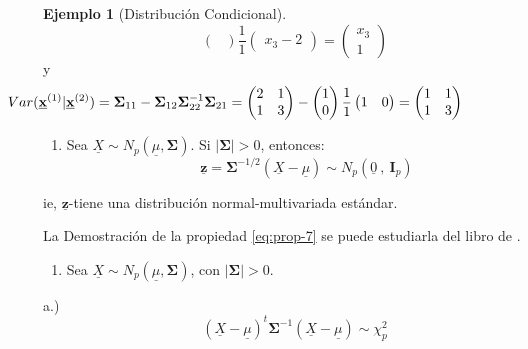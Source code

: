 \documentclass[
]{book}
\providecommand{\tightlist}{%
  \setlength{\itemsep}{0pt}\setlength{\parskip}{0pt}}
\theoremstyle{definition}
\theoremstyle{definition}
\newtheorem{example}{Ejemplo}[chapter]
\theoremstyle{definition}
\theoremstyle{definition}
\theoremstyle{remark}
\begin{document}
\begin{example}[Distribución Condicional]
\[\begin{pmatrix}
\end{pmatrix} \frac{1}{1}\begin{pmatrix}
x_3-2
\end{pmatrix}=\begin{pmatrix}
x_3 \\ 1
\end{pmatrix}
\]
y
\[
\hspace{-3.0cm} Var(\underline{\mathbf{x}}^{(1)} | \underline{\mathbf{x}}^{(2)})=
\mathbf{\Sigma}_{11}-\mathbf{\Sigma}_{12}\mathbf{\Sigma}_{22}^{-1}\mathbf{\Sigma}_{21}=\begin{pmatrix}
2 & 1 \\ 1 & 3
\end{pmatrix}-\begin{pmatrix}
1 \\ 0
\end{pmatrix}\frac{1}{1}\begin{pmatrix}
1 & 0
\end{pmatrix}=\begin{pmatrix}
1 & 1 \\ 1 & 3
\end{pmatrix}
\]
\end{example}

\begin{enumerate}
\def\labelenumi{\arabic{enumi}.}
\setcounter{enumi}{6}
\tightlist
\item
  Sea \(\underline{X}\sim N_p(\underline{\mu},\mathbf{\Sigma})\). Si \(|\mathbf{\Sigma}|>0\), entonces:
  \begin{equation}
  \underline{\mathbf{z}}=\mathbf{\Sigma}^{-1/2}(\underline{X}-\underline{\mu}) \sim N_p (\underline{0}\ , \ \mathbf{I}_p)
  \label{eq:prop-7}
  \end{equation}
\end{enumerate}

ie, \(\underline{\mathbf{z}}\)-tiene una distribución normal-multivariada estándar.

La Demostración de la propiedad \eqref{eq:prop-7} se puede estudiarla del libro de \citep{johnson2007applied}.

\begin{enumerate}
\def\labelenumi{\arabic{enumi}.}
\setcounter{enumi}{7}
\tightlist
\item
  Sea \(\underline{X}\sim N_p(\underline{\mu},\mathbf{\Sigma})\), con \(|\mathbf{\Sigma}|>0\).
\end{enumerate}

a.)
\begin{equation}
(\underline{X}-\underline{\mu})^t\mathbf{\Sigma}^{-1}(\underline{X}-\underline{\mu})\sim \chi_{p}^2
\label{eq:prop-8a}
\end{equation}
\end{document}
